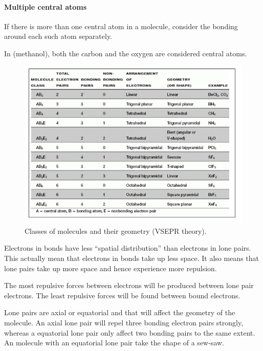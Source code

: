 \documentclass[../mit-general-chemistry.tex]{subfiles}
\begin{document}
\paragraph{Multiple central atoms}
If there is more than one central atom in a molecule, consider the
bonding around each such atom separately.

\begin{center}
\end{center}

In  (methanol), both the carbon and the oxygen are considered
central atoms.


\begin{figure}[t]
  \begin{center}
    \includegraphics{vsepr1}
    \caption{Classes of molecules and their geometry (VSEPR theory).}
  \end{center}
\end{figure}



Electrons in bonds have less ``spatial distribution'' than electrons in
lone pairs. This actually mean that electrons in bonds take up less
space. It also means that lone pairs take up more space and hence
experience more repulsion.

The most repulsive forces between electrons will be produced between
lone pair electrons. The least repulsive forces will be found between
bound electrons.


Lone pairs are axial or equatorial and that will affect the geometry
of the molecule. An axial lone pair will repel three bonding electron
pairs strongly, whereas a equatorial lone pair only affect two bonding
pairs to the same extent. An  molecule with an
equatorial lone pair take the shape of a sew-saw.
\end{document}
